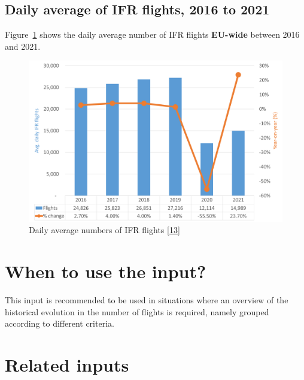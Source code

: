 \documentclass[
  11pt,
  a4paper,
]{book}
\begin{document}
\hypertarget{daily-average-of-ifr-flights-2016-to-2021}{%
\subsection{Daily average of IFR flights, 2016 to
2021}\label{daily-average-of-ifr-flights-2016-to-2021}}

Figure~\ref{fig-average-daily-ifr-flights-plot} shows the daily average
number of IFR flights \textbf{EU-wide} between 2016 and 2021.

\begin{figure}

{\centering \includegraphics{chapters/../figures/average_daily_flights.png}

}

\caption{\label{fig-average-daily-ifr-flights-plot}Daily average numbers
of IFR flights \protect\hyperlink{ref-prb:dashboard:2022}{{[}13{]}}}

\end{figure}

\hypertarget{when-to-use-the-input}{%
\section{When to use the input?}\label{when-to-use-the-input}}

This input is recommended to be used in situations where an overview of
the historical evolution in the number of flights is required, namely
grouped according to different criteria.

\hypertarget{related-inputs-2}{%
\section{Related inputs}\label{related-inputs-2}}
\end{document}
